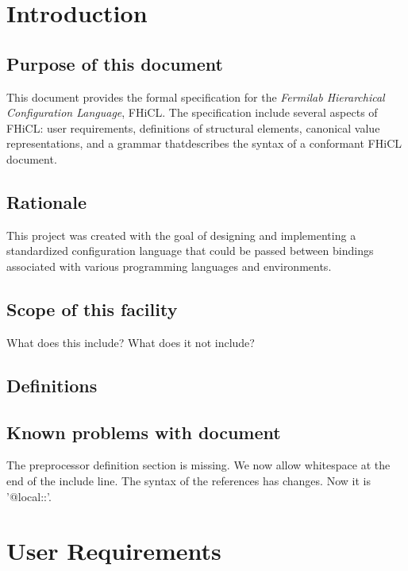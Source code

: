 \documentclass{memarticle}
\begin{document}
\topmatter
\chapter{Introduction}

\section{Purpose of this document}
This document provides the formal specification
for the \emph{Fermilab Hierarchical Configuration Language}, FHiCL.
The specification include several aspects of FHiCL:
user requirements, definitions of structural elements,
canonical value representations,
and a grammar thatdescribes the syntax of a conformant FHiCL document.

\section{Rationale}

\begin{fixme}
  This project was created with the goal of designing
  and implementing a standardized configuration language
  that could be passed between bindings associated
  with various programming languages and environments.
\end{fixme}

\section{Scope of this facility}

\begin{fixme}
  What does this include? What does it not include?
\end{fixme}

\section{Definitions}

\section{Known problems with document}

The preprocessor definition section is missing.  We now allow whitespace at the end of the include line.
The syntax of the references has changes.  Now it is '@local::'.

\chapter{User Requirements}
\end{document}
